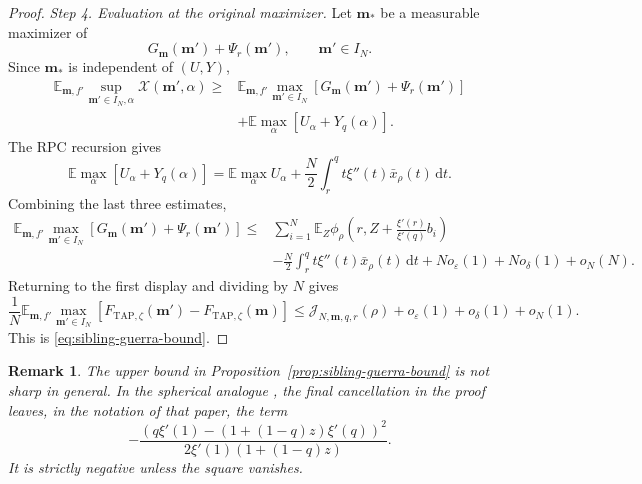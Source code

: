 \documentclass[a4paper,10pt,reqno]{amsart}
\numberwithin{equation}{section}
\newtheorem{remark}{Remark}[section]%
\newcommand{\ve}{\varepsilon}
\newcommand{\dE}{\mathbb{E}}%
\newcommand{\mc}{\mathcal}
\newcommand{\dd}{\mathrm{d}}
\newcommand{\TAP}{\mathrm{TAP}}
\newcommand{\bfm}{\mathbf{m}}
\begin{document}
\begin{proof}
		\medskip\noindent\emph{Step 4. Evaluation at the original maximizer.}
		Let \(\bfm_*\) be a measurable maximizer of
		\[
		G_\bfm(\bfm')+\Psi_r(\bfm'),
		\qquad \bfm'\in I_N.
		\]
		Since \(\bfm_*\) is independent of \((U,Y)\),
		\[
		\begin{aligned}
			\dE_{\bfm,f'}
			\sup_{\bfm'\in I_N,\alpha}\mathcal X(\bfm',\alpha)
			\ge{}&
			\dE_{\bfm,f'}
			\max_{\bfm'\in I_N}
			\left[
			G_\bfm(\bfm')+\Psi_r(\bfm')
			\right]\\
			&+
			\dE\max_\alpha
			\left[
			U_\alpha+Y_q(\alpha)
			\right].
		\end{aligned}
		\]
		The RPC recursion gives
		\[
		\dE\max_\alpha
		\left[
		U_\alpha+Y_q(\alpha)
		\right]
		=
		\dE\max_\alpha U_\alpha
		+\frac N2
		\int_r^q t\xi''(t)\bar x_\rho(t)\,\dd t.
		\]
		Combining the last three estimates,
		\[
		\begin{aligned}
			\dE_{\bfm,f'}
			\max_{\bfm'\in I_N}
			\left[
			G_\bfm(\bfm')+\Psi_r(\bfm')
			\right]
			\le{}&
			\sum_{i=1}^N
			\dE_Z\phi_\rho\left(
			r,Z+\frac{\xi'(r)}{\xi'(q)}b_i
			\right)\\
			&-
			\frac N2
			\int_r^q t\xi''(t)\bar x_\rho(t)\,\dd t
			+N o_\ve(1)+N o_\delta(1)+o_N(N).
		\end{aligned}
		\]
		Returning to the first display and dividing by \(N\) gives
		\[
		\frac1N\dE_{\bfm,f'}
		\max_{\bfm'\in I_N}
		\left[
		F_{\TAP,\zeta}(\bfm')-F_{\TAP,\zeta}(\bfm)
		\right]
		\le
		\mc J_{N,\bfm,q,r}(\rho)
		+o_\ve(1)+o_\delta(1)+o_N(1).
		\]
		This is \eqref{eq:sibling-guerra-bound}.
	\end{proof}
	
	\begin{remark}
		The upper bound in Proposition~\ref{prop:sibling-guerra-bound} is not
		sharp in general. In the spherical analogue
		\cite[Proposition~3.13]{HuangSellke}, the final cancellation in the proof
		leaves, in the notation of that paper, the term
		\[
		-\frac{
			\left(
			q\xi'(1)-(1+(1-q)z)\xi'(q)
			\right)^2
		}{
			2\xi'(1)(1+(1-q)z)
		}.
		\]
		It is strictly negative unless the square vanishes.
	\end{remark}
	
\end{document}
